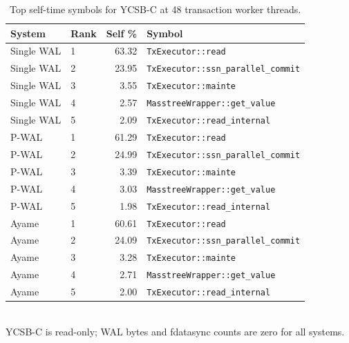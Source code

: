\begin{table}[t]
  \centering
  \caption{Top self-time symbols for YCSB-C at 48 transaction worker threads.}
  \label{tab:ycsbc-perf-top}
  \small
  \setlength{\tabcolsep}{6pt}
  \begin{tabular}{llrl}
    \hline
    System & Rank & Self \% & Symbol \\
    \hline
    Single WAL & 1 & 63.32 & \texttt{TxExecutor::read} \\
    Single WAL & 2 & 23.95 & \texttt{TxExecutor::ssn\_parallel\_commit} \\
    Single WAL & 3 & 3.55 & \texttt{TxExecutor::mainte} \\
    Single WAL & 4 & 2.57 & \texttt{MasstreeWrapper::get\_value} \\
    Single WAL & 5 & 2.09 & \texttt{TxExecutor::read\_internal} \\
    P-WAL & 1 & 61.29 & \texttt{TxExecutor::read} \\
    P-WAL & 2 & 24.99 & \texttt{TxExecutor::ssn\_parallel\_commit} \\
    P-WAL & 3 & 3.39 & \texttt{TxExecutor::mainte} \\
    P-WAL & 4 & 3.03 & \texttt{MasstreeWrapper::get\_value} \\
    P-WAL & 5 & 1.98 & \texttt{TxExecutor::read\_internal} \\
    Ayame & 1 & 60.61 & \texttt{TxExecutor::read} \\
    Ayame & 2 & 24.09 & \texttt{TxExecutor::ssn\_parallel\_commit} \\
    Ayame & 3 & 3.28 & \texttt{TxExecutor::mainte} \\
    Ayame & 4 & 2.71 & \texttt{MasstreeWrapper::get\_value} \\
    Ayame & 5 & 2.00 & \texttt{TxExecutor::read\_internal} \\
    \hline
  \end{tabular}
  \\[-1mm]
  {\footnotesize YCSB-C is read-only; WAL bytes and fdatasync counts are zero for all systems.}
\end{table}
